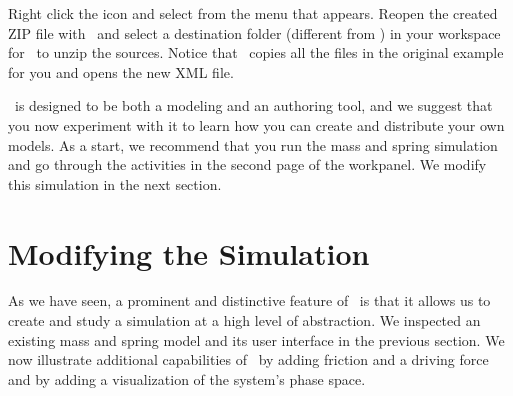 \begin{exercise}\label{ex:03ExplorationJavascript/redistribution}
Right click the  icon and select  from the menu that appears.  Reopen the created ZIP file with \ejs\ and select a destination folder (different from ) in your workspace for \ejs\ to unzip the sources. Notice that \ejs\ copies all the files in the original example for you and opens the new  XML file.
\end{exercise}

\ejs\ is designed to be both a modeling and an authoring tool, and we suggest that you now experiment with it to learn
how you can create and distribute your own models. As a start, we recommend that you run the mass and spring simulation
and go through the activities in the second page of the  workpanel.  We modify this simulation in the next
section.

\section{Modifying the Simulation}\label{section:03ExplorationJavascriptModifying}

As we have seen, a prominent and distinctive feature of \Ejs\ is that it allows us to create and study a simulation at
a high level of abstraction. We inspected an existing mass and spring model and its user interface in the previous
section. We now illustrate additional capabilities of \Ejs\ by adding friction and a driving force and by adding a
visualization of the system's phase space.

